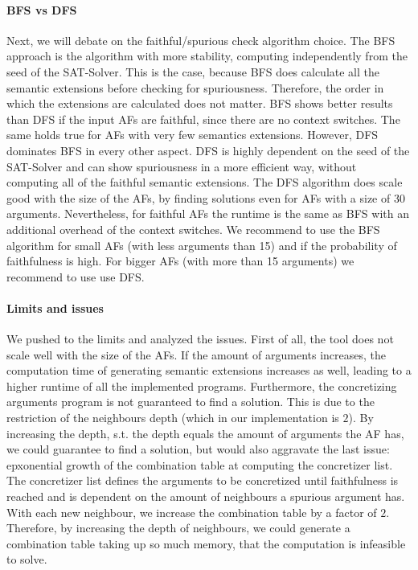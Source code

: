 \paragraph{BFS vs DFS} Next, we will debate on the faithful/spurious check algorithm choice. The BFS approach is the algorithm with more stability, computing independently from the seed of the SAT-Solver. This is the case, because BFS does calculate all the semantic extensions before checking for spuriousness. Therefore, the order in which the extensions are calculated does not matter. BFS shows better results than DFS if the input AFs are faithful, since there are no context switches. The same holds true for AFs with very few semantics extensions. However, DFS dominates BFS in every other aspect. DFS is highly dependent on the seed of the SAT-Solver and can show spuriousness in a more efficient way, without computing all of the faithful semantic extensions. The DFS algorithm does scale good with the size of the AFs, by finding solutions even for AFs with a size of 30 arguments. Nevertheless, for faithful AFs the runtime is the same as BFS with an additional overhead of the context switches. We recommend to use the BFS algorithm for small AFs (with less arguments than 15) and if the probability of faithfulness is high. For bigger AFs (with more than 15 arguments) we recommend to use use DFS.

\paragraph{Limits and issues} We pushed \prog to the limits and analyzed the issues. First of all, the tool does not scale well with the size of the AFs. If the amount of arguments increases, the computation time of generating semantic extensions increases as well, leading to a higher runtime of all the implemented programs. Furthermore, the concretizing arguments program is not guaranteed to find a solution. This is due to the restriction of the neighbours depth (which in our implementation is $2$). By increasing the depth, s.t. the depth equals the amount of arguments the AF has, we could guarantee to find a solution, but would also aggravate the last issue: epxonential growth of the combination table at computing the concretizer list. The concretizer list defines the arguments to be concretized until faithfulness is reached and is dependent on the amount of neighbours a spurious argument has. With each new neighbour, we increase the combination table by a factor of $2$. Therefore, by increasing the depth of neighbours, we could generate a combination table taking up so much memory, that the computation is infeasible to solve.


